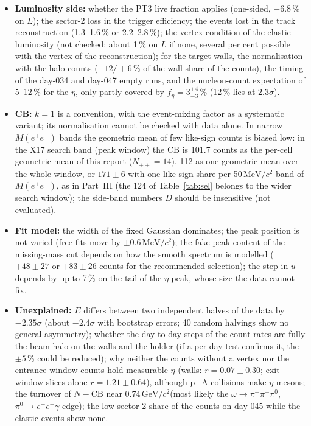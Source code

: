 \documentclass[11pt,a4paper]{article}
\newcommand{\piz}{\ensuremath{\pi^{0}}\xspace}
\newcommand{\ee}{\ensuremath{e^{+}e^{-}}\xspace}
\newcommand{\pipi}{\ensuremath{\pi^{+}\pi^{-}}\xspace}
\newcommand{\Mee}{\ensuremath{M(e^{+}e^{-})}\xspace}
\newcommand{\GeVcc}{\ensuremath{\mathrm{GeV}/c^{2}}\xspace}
\newcommand{\MeVcc}{\ensuremath{\mathrm{MeV}/c^{2}}\xspace}
\begin{document}
\begin{itemize}
\item \textbf{Luminosity side:} whether the PT3 live fraction applies (one-sided, $-6.8$\,\% on $L$); the sector-2 loss in the trigger
      efficiency; the events lost in the track reconstruction (1.3--1.6\,\% or 2.2--2.8\,\%); the vertex condition of the elastic
      luminosity (not checked: about 1\,\% on $L$ if none, several per cent possible with the vertex of the reconstruction); for the target
      walls, the normalisation with the halo counts ($-12/+6$\,\% of the wall share of the counts), the timing of the day-034 and day-047
      empty runs, and the nucleon-count expectation of 5--12\,\% for the $\eta$, only partly covered by $f_\eta=3^{+4}_{-3}$\,\% (12\,\% lies
      at 2.3$\sigma$).
\item \textbf{CB:} $k=1$ is a convention, with the event-mixing factor as a systematic variant; its normalisation cannot be checked with
      data alone. In narrow \Mee bands the geometric mean of few like-sign counts is biased low: in the X17 search band (peak window) the
      CB is 101.7 counts as the per-cell geometric mean of this report ($N_{++}=14$), 112 as one geometric mean over the whole window, or
      $171\pm6$ with one like-sign share per 50\,\MeVcc band of \Mee, as in Part~III (the 124 of Table~\ref{tab:sel} belongs to the wider
      search window); the side-band numbers $D$ should be insensitive (not evaluated).
\item \textbf{Fit model:} the width of the fixed Gaussian dominates; the peak position is not varied (free fits move by $\pm0.6$\,\MeVcc);
      the fake peak content of the missing-mass cut depends on how the smooth spectrum is modelled ($+48\pm27$ or $+83\pm26$ counts for
      the recommended selection); the step in $u$ depends by up to 7\,\% on the tail of the $\eta$ peak, whose size the data cannot fix.
\item \textbf{Unexplained:} $E$ differs between two independent halves of the data by $-2.35\sigma$ (about $-2.4\sigma$ with bootstrap
      errors; 40 random halvings show no general asymmetry); whether the day-to-day steps of the count rates are fully the beam halo on the
      walls and the holder (if a per-day test confirms it, the $\pm5$\,\% could be reduced); why neither the counts without a vertex nor
      the entrance-window counts hold measurable $\eta$ (walls: $r=0.07\pm0.30$; exit-window slices alone $r=1.21\pm0.64$), although p+A
      collisions make $\eta$ mesons; the turnover of $N-\mathrm{CB}$ near 0.74\,\GeVcc (most likely the $\omega\to\pipi\piz$,
      $\piz\to\ee\gamma$ edge); the low sector-2 share of the counts on day 045 while the elastic events show none.
\end{itemize}
\end{document}
